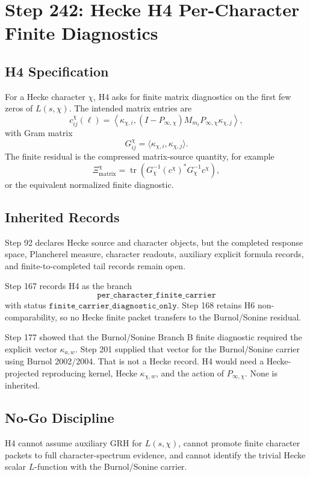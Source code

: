 \section*{Step 242: Hecke H4 Per-Character Finite Diagnostics}

\subsection*{H4 Specification}

For a Hecke character \(\chi\), H4 asks for finite matrix diagnostics on the
first few zeros of \(L(s,\chi)\). The intended matrix entries are
\[
c_{ij}^{\chi}(\ell)
 =
\left\langle
\kappa_{\chi,i},
(I-P_{\infty,\chi})M_{m_\ell}P_{\infty,\chi}
\kappa_{\chi,j}
\right\rangle,
\]
with Gram matrix
\[
G_{ij}^{\chi}=\langle \kappa_{\chi,i},\kappa_{\chi,j}\rangle.
\]
The finite residual is the compressed matrix-source quantity, for example
\[
\Xi_{\mathrm{matrix}}^{\chi}
 =
\operatorname{tr}\left(
G_\chi^{-1}(c^\chi)^*G_\chi^{-1}c^\chi
\right),
\]
or the equivalent normalized finite diagnostic.

\subsection*{Inherited Records}

Step 92 declares Hecke source and character objects, but the completed response
space, Plancherel measure, character readouts, auxiliary explicit formula
records, and finite-to-completed tail records remain open.

Step 167 records H4 as the branch
\[
\texttt{per\_character\_finite\_carrier}
\]
with status \(\texttt{finite\_carrier\_diagnostic\_only}\). Step 168 retains
H6 non-comparability, so no Hecke finite packet transfers to the
Burnol/Sonine residual.

Step 177 showed that the Burnol/Sonine Branch B finite diagnostic required the
explicit vector \(\kappa_{a,w}\). Step 201 supplied that vector for the
Burnol/Sonine carrier using Burnol 2002/2004. That is not a Hecke record. H4
would need a Hecke-projected reproducing kernel, Hecke \(\kappa_{\chi,w}\), and
the action of \(P_{\infty,\chi}\). None is inherited.

\subsection*{No-Go Discipline}

H4 cannot assume auxiliary GRH for \(L(s,\chi)\), cannot promote finite
character packets to full character-spectrum evidence, and cannot identify
the trivial Hecke scalar \(L\)-function with the Burnol/Sonine carrier.

